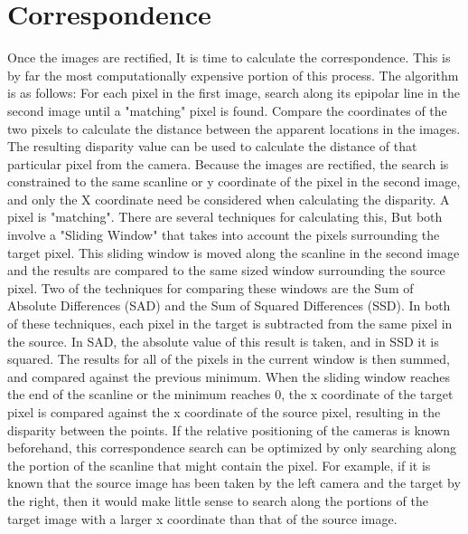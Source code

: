 \section{Correspondence}
Once the images are rectified, It is time to calculate the correspondence.  This is by far the most computationally expensive portion of this process.  The algorithm is as follows:  For each pixel in the first image, search along its epipolar line in the second image until a "matching" pixel is found.  Compare the coordinates of the two pixels to calculate the distance between the apparent locations in the images. The resulting disparity value can be used to calculate the distance of that particular pixel from the camera.  Because the images are rectified, the search is constrained to the same scanline or y coordinate of the pixel in the second image, and only the X coordinate need be considered when calculating the disparity.  A pixel is "matching".  There are several techniques for calculating this, But both involve a "Sliding Window" that takes into account the pixels surrounding the target pixel.  This sliding window is moved along the scanline in the second image and the results are compared to the same sized window surrounding the source pixel.  Two of the techniques for comparing these windows are the Sum of Absolute Differences (SAD) and the Sum of Squared Differences (SSD).  In both of these techniques, each pixel in the target is subtracted from the same pixel in the source.  In SAD, the absolute value of this result is taken, and in SSD it is squared.  The results for all of the pixels in the current window is then summed, and compared against the previous minimum.  When the sliding window reaches the end of the scanline or the minimum reaches 0, the x coordinate of the target pixel is compared against the x coordinate of the source pixel, resulting in the disparity between the points.  If the relative positioning of the cameras is known beforehand, this correspondence search can be optimized by only searching along the portion of the scanline that might contain the pixel.  For example, if it is known that the source image has been taken by the left camera and the target by the right, then it would make little sense to search along the portions of the target image with a larger x coordinate than that of the source image.